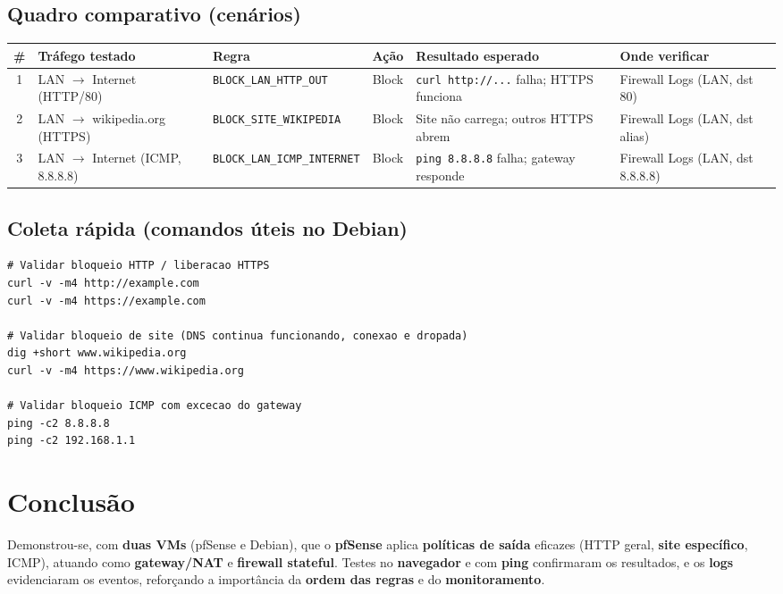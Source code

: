 \subsection{Quadro comparativo (cenários)}

\begin{tabularx}{\linewidth}{cXlcXX}
\toprule
\textbf{\#} & \textbf{Tráfego testado} & \textbf{Regra} & \textbf{Ação} & \textbf{Resultado esperado} & \textbf{Onde verificar} \\
\midrule
1 & LAN $\rightarrow$ Internet (HTTP/80)          & \texttt{BLOCK\_LAN\_HTTP\_OUT}      & Block & \texttt{curl http://...} falha; HTTPS funciona       & Firewall Logs (LAN, dst 80) \\
2 & LAN $\rightarrow$ wikipedia.org (HTTPS)       & \texttt{BLOCK\_SITE\_WIKIPEDIA}      & Block & Site não carrega; outros HTTPS abrem                  & Firewall Logs (LAN, dst alias) \\
3 & LAN $\rightarrow$ Internet (ICMP, 8.8.8.8)    & \texttt{BLOCK\_LAN\_ICMP\_INTERNET}  & Block & \texttt{ping 8.8.8.8} falha; gateway responde         & Firewall Logs (LAN, dst 8.8.8.8) \\
\bottomrule
\end{tabularx}

\subsection{Coleta rápida (comandos úteis no Debian)}

\begin{lstlisting}
# Validar bloqueio HTTP / liberacao HTTPS
curl -v -m4 http://example.com
curl -v -m4 https://example.com

# Validar bloqueio de site (DNS continua funcionando, conexao e dropada)
dig +short www.wikipedia.org
curl -v -m4 https://www.wikipedia.org

# Validar bloqueio ICMP com excecao do gateway
ping -c2 8.8.8.8
ping -c2 192.168.1.1
\end{lstlisting}

\section{Conclusão}

Demonstrou-se, com \textbf{duas VMs} (pfSense e Debian), que o \textbf{pfSense} aplica \textbf{políticas de saída} eficazes (HTTP geral, \textbf{site específico}, ICMP), atuando como \textbf{gateway/NAT} e \textbf{firewall stateful}. Testes no \textbf{navegador} e com \textbf{ping} confirmaram os resultados, e os \textbf{logs} evidenciaram os eventos, reforçando a importância da \textbf{ordem das regras} e do \textbf{monitoramento}.

